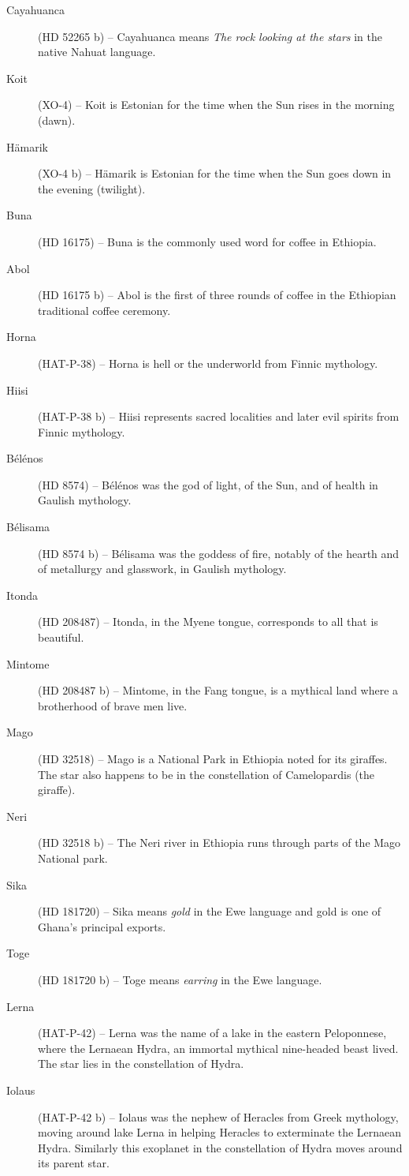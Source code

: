 \begin{description}
\item[Cayahuanca] (HD 52265 b) -- Cayahuanca means \textit{The rock looking at the stars} in the native Nahuat language.
\item[Koit] (XO-4) -- Koit is Estonian for the time when the Sun rises in the morning (dawn).
\item[Hämarik] (XO-4 b) -- Hämarik is Estonian for the time when the Sun goes down in the evening (twilight).
\item[Buna] (HD 16175) -- Buna is the commonly used word for coffee in Ethiopia.
\item[Abol] (HD 16175 b) -- Abol is the first of three rounds of coffee in the Ethiopian traditional coffee ceremony.
\item[Horna] (HAT-P-38) -- Horna is hell or the underworld from Finnic mythology.
\item[Hiisi] (HAT-P-38 b) -- Hiisi represents sacred localities and later evil spirits from Finnic mythology.
\item[Bélénos] (HD 8574) -- Bélénos was the god of light, of the Sun, and of health in Gaulish mythology.
\item[Bélisama] (HD 8574 b) -- Bélisama was the goddess of fire, notably of the hearth and of metallurgy and glasswork, in Gaulish mythology.
\item[Itonda] (HD 208487) -- Itonda, in the Myene tongue, corresponds to all that is beautiful.
\item[Mintome] (HD 208487 b) -- Mintome, in the Fang tongue, is a mythical land where a brotherhood of brave men live.
\item[Mago] (HD 32518) -- Mago is a National Park in Ethiopia noted for its giraffes. The star also happens to be in the constellation of Camelopardis (the giraffe).
\item[Neri] (HD 32518 b) -- The Neri river in Ethiopia runs through parts of the Mago National park.
\item[Sika] (HD 181720) -- Sika means \textit{gold} in the Ewe language and gold is one of Ghana's principal exports.
\item[Toge] (HD 181720 b) -- Toge means \textit{earring} in the Ewe language.
\item[Lerna] (HAT-P-42) -- Lerna was the name of a lake in the eastern Peloponnese, where the Lernaean Hydra, an immortal mythical nine-headed beast lived. The star lies in the constellation of Hydra.
\item[Iolaus] (HAT-P-42 b) -- Iolaus was the nephew of Heracles from Greek mythology, moving around lake Lerna in helping Heracles to exterminate the Lernaean Hydra. Similarly this exoplanet in the constellation of Hydra moves around its parent star.

\end{description}

